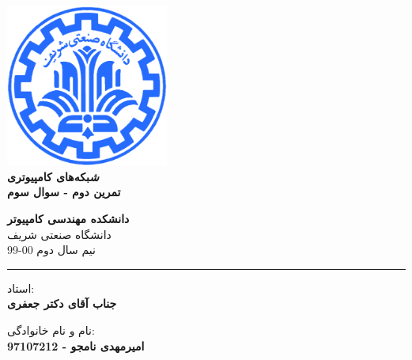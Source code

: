 \documentclass[12pt]{article}
\begin{document}
	
	
	\begin{titlepage}
		\begin{center}
			
			\vspace*{0.7cm}
			
			\includegraphics[width=0.4\textwidth]{sharif1.png}\\
			\vspace{0.5cm}
			\textbf{ \Huge{\emph  ﺷﺒﻜﻪ‌های کامپیوتری} }\\
			\vspace{0.5cm}
			\textbf{ \Large{ تمرین دوم - سوال سوم} }
			\vspace{0.2cm}
			
			
			\large \textbf{دانشکده مهندسی کامپیوتر}\\\vspace{0.2cm}
			\large   دانشگاه صنعتی شریف\\\vspace{0.2cm}
			\large   ﻧﯿﻢ سال دوم 00-99 \\\vspace{0.2cm}
			\noindent\rule[1ex]{\linewidth}{1pt}
			استاد:\\
			\textbf{{جناب آقای دکتر جعفری}}
			
			
			\vspace{0.15cm}
			نام و نام خانوادگی:\\
			
			
			\textbf{{امیرمهدی نامجو - 97107212}}
		\end{center}
	\end{titlepage}
	
	
	\newpage
	\pagestyle{fancy}
	\fancyhf{}
	\fancyfoot{}
	\cfoot{\thepage}
	
\end{document}
